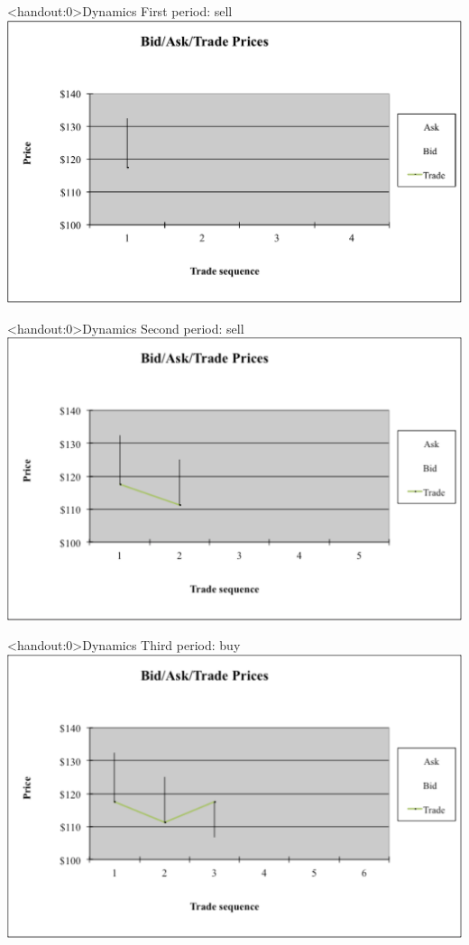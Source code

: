 \documentclass[english,10pt
,aspectratio=169
]{beamer}
\begin{document}
\begin{frame}<handout:0>{Dynamics}
	First period: sell
	\center
	\includegraphics[width=0.9\linewidth]{pics/P1_Image.pdf}
\end{frame}


\begin{frame}<handout:0>{Dynamics}
	Second period: sell
	\center
	\includegraphics[width=0.9\linewidth]{pics/P2_Image.pdf}
\end{frame}


\begin{frame}<handout:0>{Dynamics}
	Third period: buy
	\center
	\includegraphics[width=0.9\linewidth]{pics/P3_Image.pdf}
\end{frame}
\end{document}
